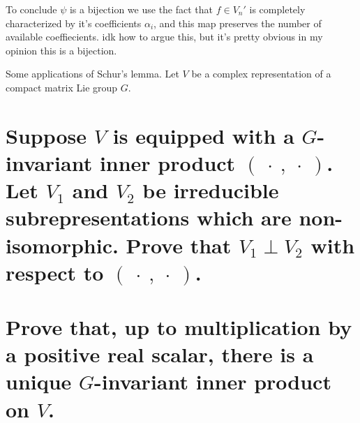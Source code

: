 \documentclass[
	pages,
	boxes,
	color=WildStrawberry
]{homework}
\begin{document}
\begin{solution}
	To conclude $\psi$ is a bijection we use the fact that $f\in V_n'$ is completely characterized by it's coefficients $\alpha_i$, and this map preserves the number of available coeffiecients. idk how to argue this, but it's pretty obvious in my opinion this is a bijection.

\end{solution}

\begin{problem}
Some applications of Schur's lemma. Let $V$ be a complex representation of a compact matrix Lie group $G$.
\begin{parts}
	\part{Suppose $V$ is equipped with a $G$-invariant inner product $(\ \cdot\ , \ \cdot\ )$. Let $V_1$ and $V_2$ be irreducible subrepresentations which are non-isomorphic. Prove that $V_1 \perp V_2$ with respect to $(\ \cdot\ , \ \cdot\ )$.}\label{part:6a}
	\part{Prove that, up to multiplication by a positive real scalar, there is a unique $G$-invariant inner product on $V$.}\label{part:6b}
\end{parts}
\end{problem}
\end{document}
